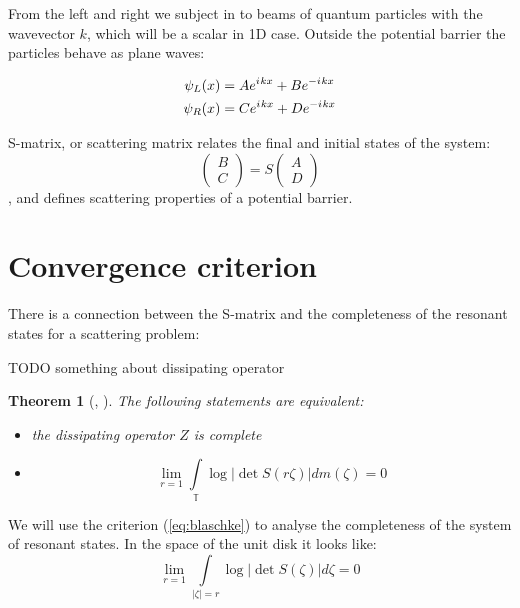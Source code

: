 \documentclass{gCOV2e}
\theoremstyle{plain}%
\newtheorem{theorem}{Theorem}[section]
\theoremstyle{definition}
\theoremstyle{remark}
\newcommand{\iu}{{i\mkern1mu}} %
\newcommand{\eexp}[1]{e^{#1}}  %
\newcommand\abs[1]{\left|#1\right|}
\begin{document}
From the left and right we subject in to beams of quantum particles with the wavevector $k$, which will be a scalar in 1D case. Outside the potential barrier the particles behave as plane waves:

\begin{equation}\label{eq:wlwl}
\begin{aligned}
   \psi_L(x) &= A \eexp{\iu k x} + B \eexp{-\iu k x}
\\ \psi_R(x) &= C \eexp{\iu k x} + D \eexp{-\iu k x}
\end{aligned}
\end{equation}

S-matrix, or scattering matrix relates the final and initial states of the system:
\begin{equation}\label{eq:smatrix}
\begin{pmatrix} B \\ C \end{pmatrix} = S \begin{pmatrix} A \\ D \end{pmatrix}
\end{equation}
, and defines scattering properties of a potential barrier.

\section{Convergence criterion}
There is a connection between the S-matrix and the completeness of the resonant states for a scattering problem:

TODO something about dissipating operator

\begin{theorem}[{\cite[p. 95]{nikol2012treatise}}, {\cite[p. 99]{nikol2012treatise}}]
The following statements are equivalent:
\begin{itemize}
\item the dissipating operator $Z$ is complete
\item
\begin{equation}\label{eq:blaschke}
\lim\limits_{r = 1} \int\limits_{\mathbb{T}} \log \abs{\det S(r \zeta)} d m(\zeta) = 0
\end{equation}
\end{itemize}
\end{theorem}

We will use the criterion (\ref{eq:blaschke}) to analyse the completeness of the system of resonant states. In the space of the unit disk it looks like:
\begin{equation}\label{eq:crit_cayley}
\lim\limits_{r = 1} \int\limits_{\abs{\zeta} = r} \log \abs{\det S(\zeta)} d \zeta = 0
\end{equation}
\end{document}
